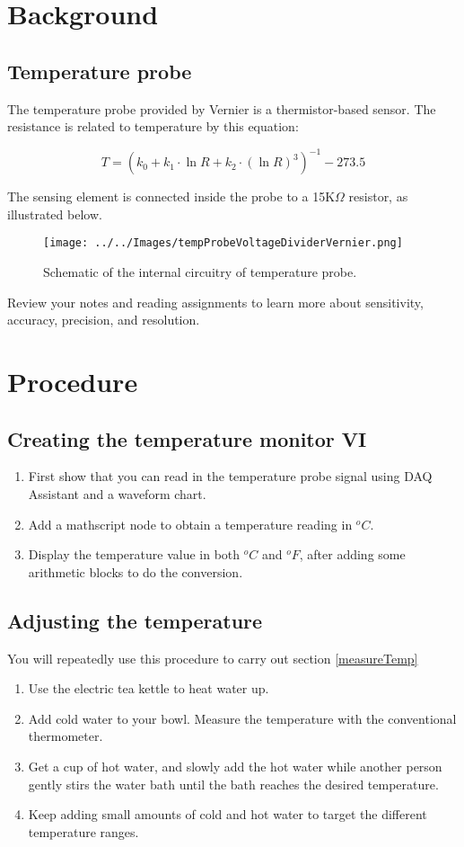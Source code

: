 \documentclass[12pt,oneside]{article}
\begin{document}
\section{Background}
\subsection{Temperature probe}
The temperature probe provided by Vernier is a thermistor-based sensor. The resistance is related to temperature by this equation:

\begin{equation*}
T = (k_0 + k_1\cdot\ln{R} + k_2\cdot(\ln{R})^3)^{-1} - 273.5
\end{equation*}

 The sensing element is connected inside the probe to a 15K$\Omega$ resistor, as illustrated below.  
\begin{figure}[h!]
\centering
  \texttt{[image: ../../Images/tempProbeVoltageDividerVernier.png]}\label{}\caption{Schematic of the internal circuitry of temperature probe.}
\end{figure}

Review your notes and reading assignments to learn more about sensitivity, accuracy, precision, and resolution.

\section{Procedure}
\subsection{Creating the temperature monitor VI}
\begin{enumerate}
\item First show that you can read in the temperature probe signal using DAQ Assistant and a waveform chart.
\item Add a mathscript node to obtain a temperature reading in $^oC$.
\item Display the temperature value in both $^oC$ and $^oF$, after adding some arithmetic blocks to do the conversion.
\end{enumerate}

\subsection{Adjusting the temperature}\label{adjustTemp}
You will repeatedly use this procedure to carry out section \ref{measureTemp}
\begin{enumerate}
\item Use the electric tea kettle to heat water up.
\item Add cold water to your bowl.  Measure the temperature with the conventional thermometer.
\item Get a cup of hot water, and slowly add the hot water while another person gently stirs the water bath until the bath reaches the desired temperature.
\item Keep adding small amounts of cold and hot water to target the different temperature ranges.
\end{enumerate}
\end{document}

